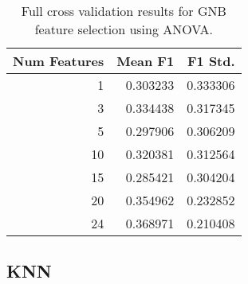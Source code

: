 \documentclass{article}
\begin{document}
\begin{table}[H]
\centering
\caption{Full cross validation results for GNB feature selection using ANOVA.}
\label{tab:gnb-anova-full}
\begin{tabular}{rrr}
\hline
   Num Features &   Mean F1 &   F1 Std. \\
\hline
              1 &  0.303233 &  0.333306 \\
              3 &  0.334438 &  0.317345 \\
              5 &  0.297906 &  0.306209 \\
             10 &  0.320381 &  0.312564 \\
             15 &  0.285421 &  0.304204 \\
             20 &  0.354962 &  0.232852 \\
             24 &  0.368971 &  0.210408 \\
\hline
\end{tabular}
\end{table}

\subsection{KNN}
\end{document}
